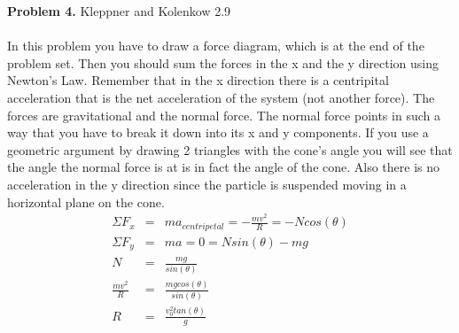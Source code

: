 \documentclass[11pt]{amsart}
\begin{document}
\textbf{Problem 4.} Kleppner and Kolenkow 2.9 \\ \\
In this problem you have to draw a force diagram, which is at the end of the problem set. Then you should sum the forces in the x and the y direction using Newton's Law. Remember that in the x direction there is a centripital acceleration that is the net acceleration of the system (not another force). The forces are gravitational and the normal force. The normal force points in such a way that you have to break it down into its x and y components. If you use a geometric argument by drawing 2 triangles with the cone's angle you will see that the angle the normal force is at is in fact the angle of the cone.  Also there is no acceleration in the y direction since the particle is suspended moving in a horizontal plane on the cone. \\
\begin{eqnarray*}
\Sigma{F_{x}} &=& ma_{centripetal} = -\frac{mv^{2}}{R} = -Ncos(\theta) \\
\Sigma{F_{y}} &=& ma = 0 = Nsin(\theta) - mg \\
N &=& \frac{mg}{sin(\theta)} \\
\frac{mv^{2}}{R} &=& \frac{mgcos(\theta)}{sin(\theta)} \\
R &=& \frac{v_{0}^{2}tan(\theta)}{g} 
\end{eqnarray*} \\
\end{document}
